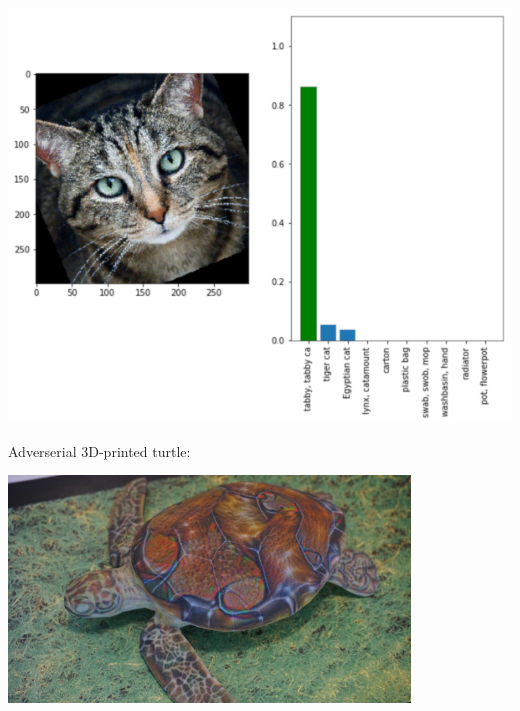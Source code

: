\documentclass[aspectratio=169,x11names]{beamer}
\begin{document}
\begin{frame}
\begin{center}
\includegraphics[height=\textheight]{images/cat_rotated.png} 
\end{center}
\end{frame}

\begin{frame}

\begin{center}
Adverserial 3D-printed turtle:
\end{center}

\begin{center}
\includegraphics[width=0.8\textwidth]{images/rifle_turtle.jpg} 
\end{center}
\end{frame}
\end{document}
